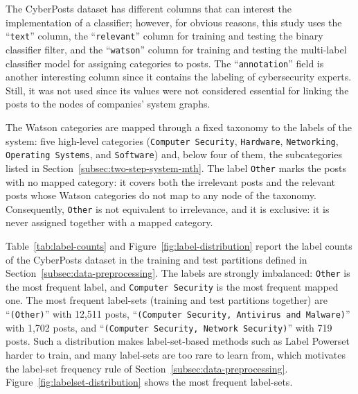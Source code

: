 The CyberPosts dataset has different columns that can interest the implementation of a classifier; however, for obvious reasons, this study uses the ``\texttt{text}'' column, the ``\texttt{relevant}'' column for training and testing the binary classifier filter, and the ``\texttt{watson}'' column for training and testing the multi-label classifier model for assigning categories to posts. The ``\texttt{annotation}'' field is another interesting column since it contains the labeling of cybersecurity experts. Still, it was not used since its values were not considered essential for linking the posts to the nodes of companies' system graphs.

The Watson categories are mapped through a fixed taxonomy to the labels of the system: five high-level categories (\texttt{Computer Security}, \texttt{Hardware}, \texttt{Networking}, \texttt{Operating Systems}, and \texttt{Software}) and, below four of them, the subcategories listed in Section~\ref{subsec:two-step-system-mth}. The label \texttt{Other} marks the posts with no mapped category: it covers both the irrelevant posts and the relevant posts whose Watson categories do not map to any node of the taxonomy. Consequently, \texttt{Other} is not equivalent to irrelevance, and it is exclusive: it is never assigned together with a mapped category.

Table~\ref{tab:label-counts} and Figure~\ref{fig:label-distribution} report the label counts of the CyberPosts dataset in the training and test partitions defined in Section~\ref{subsec:data-preprocessing}. The labels are strongly imbalanced: \texttt{Other} is the most frequent label, and \texttt{Computer Security} is the most frequent mapped one. The most frequent label-sets (training and test partitions together) are ``\texttt{(Other)}'' with 12,511 posts, ``\texttt{(Computer Security, Antivirus and Malware)}'' with 1,702 posts, and ``\texttt{(Computer Security, Network Security)}'' with 719 posts. Such a distribution makes label-set-based methods such as Label Powerset harder to train, and many label-sets are too rare to learn from, which motivates the label-set frequency rule of Section~\ref{subsec:data-preprocessing}. Figure~\ref{fig:labelset-distribution} shows the most frequent label-sets.

